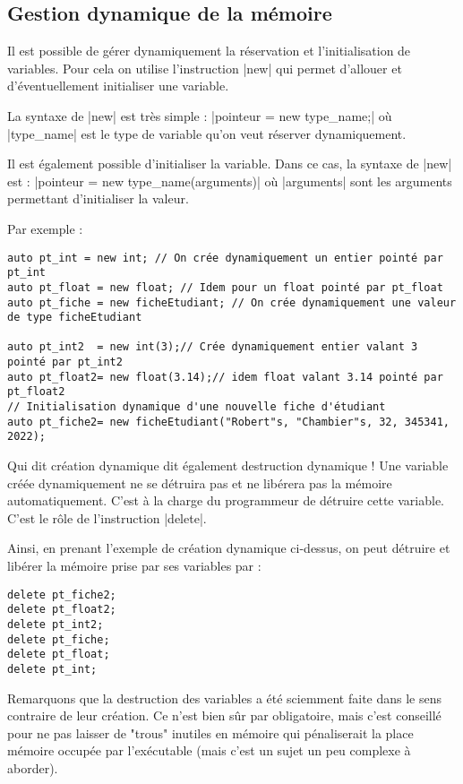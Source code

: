 \subsection{Gestion dynamique de la mémoire}

Il est possible de gérer dynamiquement la réservation et l'initialisation de variables.
Pour cela on utilise l'instruction |new| qui permet d'allouer et d'éventuellement initialiser une variable.

La syntaxe de |new| est très simple : |pointeur = new type_name;| où |type_name| est le type de variable qu'on
veut réserver dynamiquement.

Il est également possible d'initialiser la variable. Dans ce cas, la syntaxe de |new| est : |pointeur = new type_name(arguments)| où |arguments| sont les arguments permettant d'initialiser la valeur.

Par exemple :
\begin{lstlisting}
auto pt_int = new int; // On crée dynamiquement un entier pointé par pt_int
auto pt_float = new float; // Idem pour un float pointé par pt_float
auto pt_fiche = new ficheEtudiant; // On crée dynamiquement une valeur de type ficheEtudiant

auto pt_int2  = new int(3);// Crée dynamiquement entier valant 3 pointé par pt_int2
auto pt_float2= new float(3.14);// idem float valant 3.14 pointé par pt_float2
// Initialisation dynamique d'une nouvelle fiche d'étudiant
auto pt_fiche2= new ficheEtudiant("Robert"s, "Chambier"s, 32, 345341, 2022);
\end{lstlisting}

Qui dit création dynamique dit également destruction dynamique ! Une variable créée dynamiquement ne se détruira
pas et ne libérera pas la mémoire automatiquement. C'est à la charge du programmeur de détruire cette variable.
C'est le rôle de l'instruction |delete|.

Ainsi, en prenant l'exemple de création dynamique ci-dessus, on peut détruire et libérer la mémoire prise par ses
variables par :
\begin{lstlisting}
delete pt_fiche2;
delete pt_float2;
delete pt_int2;
delete pt_fiche;
delete pt_float;
delete pt_int;
\end{lstlisting}

Remarquons que la destruction des variables a été sciemment faite dans le sens contraire de leur création. Ce n'est
bien sûr par obligatoire, mais c'est conseillé pour ne pas laisser de "trous" inutiles en mémoire qui pénaliserait
la place mémoire occupée par l'exécutable (mais c'est un sujet un peu complexe à aborder).

